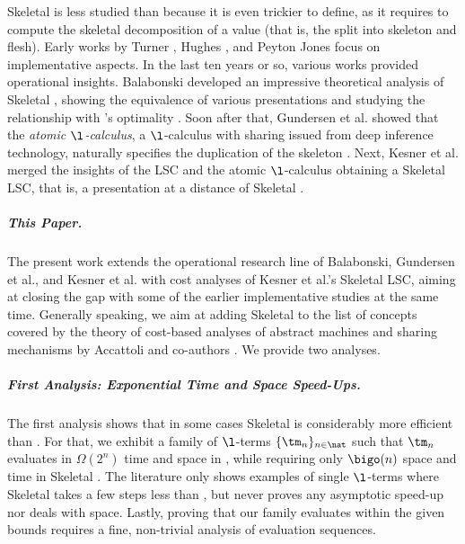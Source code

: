 Skeletal \cbneed is less studied than \cbneed because it is even trickier to define, as it requires to compute the skeletal decomposition of a value (that is, the split into skeleton and flesh). Early works by Turner \cite{DBLP:journals/spe/Turner79}, Hughes \cite{hughes:thesis}, and Peyton Jones \cite{DBLP:books/ph/Jones87} focus on implementative aspects. In the last ten years or so, various works provided operational insights. Balabonski developed an impressive theoretical analysis of Skeletal \cbneed, showing the equivalence of various presentations \cite{DBLP:conf/popl/Balabonski12} and studying the relationship with \levy's optimality \cite{DBLP:conf/icfp/Balabonski13}. Soon after that, Gundersen et al. showed that the \emph{atomic $\l$-calculus}, a $\l$-calculus with sharing issued from deep inference technology, naturally specifies the duplication of the skeleton \cite{DBLP:conf/lics/GundersenHP13}. Next, Kesner et al. \cite{DBLP:journals/lmcs/KesnerPV24} merged the insights of the \cbneed LSC and the atomic $\l$-calculus obtaining a Skeletal \cbneed LSC, that is, a presentation at a distance of Skeletal \cbneed.

\subparagraph{This Paper.} The present work extends the operational research line of Balabonski, Gundersen et al., and Kesner et al. with cost analyses of Kesner et al.'s Skeletal \cbneed LSC, aiming at closing the gap with some of the earlier implementative studies at the same time. Generally speaking, we aim at adding Skeletal \cbneed to the list of concepts covered by the theory of cost-based analyses of abstract machines and sharing mechanisms by Accattoli and co-authors \cite{DBLP:conf/icfp/AccattoliBM14,DBLP:journals/corr/AccattoliL16,DBLP:journals/iandc/AccattoliC17,DBLP:conf/ppdp/AccattoliB17,DBLP:conf/ppdp/AccattoliCGC19,DBLP:conf/ppdp/CondoluciAC19,DBLP:journals/scp/AccattoliG19,DBLP:journals/pacmpl/AccattoliLV21,DBLP:conf/lics/AccattoliCC21,DBLP:journals/lmcs/AccattoliLV24}. We provide two analyses.

\subparagraph{First Analysis: Exponential Time and Space Speed-Ups.} The first analysis shows that in some cases Skeletal \cbneed is considerably more efficient than \cbneed. For that, we exhibit a family of $\l$-terms $\{\tm_n\}_{n\in\nat}$ such that $\tm_n$ evaluates in $\Omega(2^n)$ time and space in \cbneed, while requiring only $\bigo(n)$ space and time in Skeletal \cbneed. 
The literature only shows examples of single $\l$-terms where Skeletal \cbneed takes a few steps less than \cbneed, but never proves any asymptotic speed-up nor deals with space. Lastly, proving that our family evaluates within the given bounds requires a fine, non-trivial analysis of evaluation sequences.

